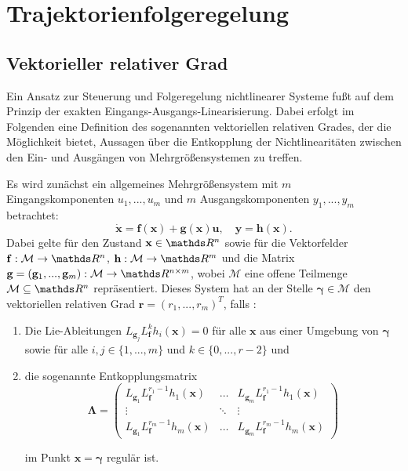 \section{Trajektorienfolgeregelung}

\subsection{Vektorieller relativer Grad}
\label{sec:definition_relative_degree}

Ein Ansatz zur Steuerung und Folgeregelung nichtlinearer Systeme fußt auf dem Prinzip der exakten Eingangs-Ausgangs-Linearisierung. Dabei erfolgt im Folgenden eine Definition des sogenannten vektoriellen relativen Grades, der die Möglichkeit bietet, Aussagen über die Entkopplung der Nichtlinearitäten zwischen den Ein- und Ausgängen von Mehrgrößensystemen zu treffen.

Es wird zunächst ein allgemeines Mehrgrößensystem mit $m$ Eingangskomponenten $u_1, ..., u_m$ und $m$ Ausgangskomponenten $y_1, ..., y_m$ betrachtet:
\begin{equation}
	\label{eq:state_space_vector_degree}
	\dot{\mathbf{x}} = \mathbf{f}(\mathbf{x}) + \mathbf{g}(\mathbf{x}) \mathbf{u}, \quad \mathbf{y} = \mathbf{h}(\mathbf{x}).
\end{equation}
Dabei gelte für den Zustand $\mathbf{x} \in \Reals^n$ sowie für die Vektorfelder $\mathbf{f}: \mathcal{M} \rightarrow \Reals^n$, ${\mathbf{h}: \mathcal{M} \rightarrow \Reals^m}$ und die Matrix $\mathbf{g} = (\mathbf{g}_1, ..., \mathbf{g}_m): \mathcal{M} \rightarrow \Reals^{n \times m}$, wobei $\mathcal{M}$ eine offene Teilmenge $\mathcal{M} \subseteq \Reals^{n}$ repräsentiert. Dieses System hat an der Stelle $\boldsymbol{\gamma} \in \mathcal{M}$ den vektoriellen relativen Grad $\mathbf{r} = (r_1, ..., r_m)^T$, falls \cite[S. 194]{NLRT_Roebenack}:
\begin{enumerate}
	\item Die Lie-Ableitungen $L_{\mathbf{g}_j} L_{\mathbf{f}}^k h_i(\mathbf{x}) = 0$ für alle $\mathbf{x}$ aus einer Umgebung von $\boldsymbol{\gamma}$ sowie für alle $i,j \in \{1, ..., m\}$ und $k \in \{0, ..., r-2\}$ und
	\item die sogenannte Entkopplungsmatrix
		\begin{equation}
		\label{eq:decoupling_matrix}
		\boldsymbol{\Lambda} = 
		\left(\begin{matrix}
		L_{\mathbf{g}_1} L_{\mathbf{f}}^{r_1 -1} h_1(\mathbf{x}) & \hdots & L_{\mathbf{g}_m} L_{\mathbf{f}}^{r_1 -1} h_1(\mathbf{x}) \\
		\vdots & \ddots & \vdots \\
		L_{\mathbf{g}_1} L_{\mathbf{f}}^{r_m -1} h_m(\mathbf{x}) & \hdots & L_{\mathbf{g}_m} L_{\mathbf{f}}^{r_m -1} h_m(\mathbf{x})
		\end{matrix}\right) 
	\end{equation}
	
	im Punkt $\mathbf{x} = \boldsymbol{\gamma}$ regulär ist.
\end{enumerate}

